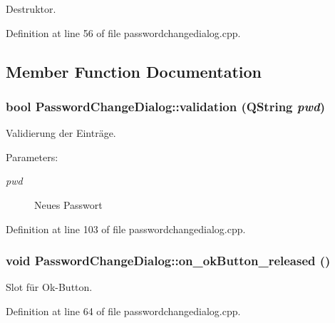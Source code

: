 Destruktor. 



Definition at line 56 of file passwordchangedialog.cpp.

\subsection{Member Function Documentation}
\hypertarget{class_password_change_dialog_b59001d4e9b88ce141f588c510024e8f}{
\subsubsection[validation]{\setlength{\rightskip}{0pt plus 5cm}bool PasswordChangeDialog::validation (QString {\em pwd})}}
\label{class_password_change_dialog_b59001d4e9b88ce141f588c510024e8f}


Validierung der Einträge. 

\begin{Desc}
\item[Parameters:]
\begin{description}
\item[{\em pwd}]Neues Passwort \end{description}
\end{Desc}


Definition at line 103 of file passwordchangedialog.cpp.\hypertarget{class_password_change_dialog_588135dfb30c966f44d8fe5a40b86fbe}{
\subsubsection[on\_\-okButton\_\-released]{\setlength{\rightskip}{0pt plus 5cm}void PasswordChangeDialog::on\_\-okButton\_\-released ()}}
\label{class_password_change_dialog_588135dfb30c966f44d8fe5a40b86fbe}


Slot für Ok-Button. 



Definition at line 64 of file passwordchangedialog.cpp.

